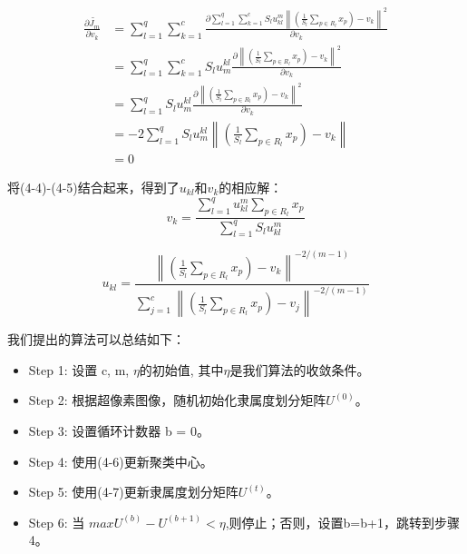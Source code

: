 \begin{equation}
\begin{split}
\frac{\partial \widetilde{J_m}}{\partial v_{k}}
&= \sum_{l=1}^{q}\sum_{k=1}^{c}\frac{\partial \sum_{l=1}^{q}\sum_{k=1}^{c}S_{l}u_{kl}^{m} \left \| (\frac{1}{S_{l}}\sum_{p\in R_{l}}x_{p})-v_{k} \right \|^{2}}{\partial v_{k}}  \\
&= \sum_{l=1}^{q}\sum_{k=1}^{c}S_{l}u_{m}^{kl}\frac{\partial \left \| (\frac{1}{S_{l}}\sum_{p\in R_{l}}x_{p})-v_{k}  \right \|^{2} }{\partial v_{k}} \\
&= \sum_{l=1}^{q} S_{l}u_{m}^{kl}\frac{\partial \left \| (\frac{1}{S_{l}}\sum_{p\in R_{l}}x_{p})-v_{k}  \right \|^{2} }{\partial v_{k}} \\
&= -2 \sum_{l=1}^{q} S_{l}u_{m}^{kl} \left \| (\frac{1}{S_{l}}\sum_{p\in R_{l}}x_{p})-v_{k} \right \| \\
&= 0
\end{split}
\end{equation}

将(4-4)-(4-5)结合起来，得到了$u_{kl}$和$v_k$的相应解： 
\begin{equation}
v_{k} = \frac{\sum_{l=1}^{q} u_{kl}^{m} \sum_{p\in R_{l}} x_{p}}{\sum_{l=1}^{q} S_{l} u_{kl}^{m}}
\end{equation}

\begin{equation}
u_{kl} = \frac{ \left \| (\frac{1}{S_{l}}\sum_{p\in R_{l}}x_{p})-v_{k} \right \|^{-2/(m-1)} }
{ \sum_{j=1}^{c} \left \| (\frac{1}{S_{l}}\sum_{p\in R_{l}}x_{p})-v_{j} \right \|^{-2/(m-1)}}
\end{equation}

我们提出的算法可以总结如下：
\begin{itemize}
\item Step 1: 设置 c, m, $\eta$的初始值, 其中$\eta$是我们算法的收敛条件。
\item Step 2: 根据超像素图像，随机初始化隶属度划分矩阵$U^{(0)}$。
\item Step 3: 设置循环计数器 b = 0。
\item Step 4: 使用(4-6)更新聚类中心。
\item Step 5: 使用(4-7)更新隶属度划分矩阵$U^{(t)}$。
\item Step 6: 当 $max{U^{(b)}-U^{(b+1)}}<\eta$,则停止；否则，设置b=b+1，跳转到步骤4。
\end{itemize}
